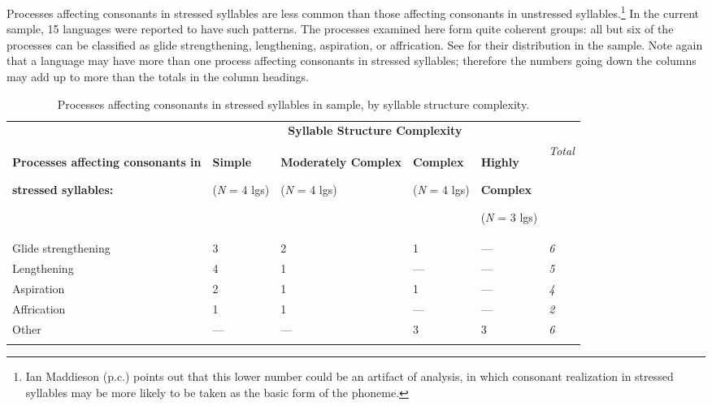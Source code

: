   Processes affecting consonants in stressed syllables are less common than those affecting consonants in unstressed syllables.\footnote{{Ian Maddieson (p.c.) points out that this lower number could be an artifact of analysis, in which consonant realization in stressed syllables may be more likely to be taken as the basic form of the phoneme.}} In the current sample, 15 languages were reported to have such patterns. The processes examined here form quite coherent groups: all but six of the processes can be classified as glide strengthening, lengthening, aspiration, or affrication. See  for their distribution in the sample. Note again that a language may have more than one process affecting consonants in stressed syllables; therefore the numbers going down the columns may add up to more than the totals in the column headings.

\begin{table}
\begin{tabularx}{\textwidth}{XXXXXX}
\lsptoprule
 & \multicolumn{4}{c}{ \textbf{Syllable Structure Complexity}} & \\
{ \textbf{Processes affecting consonants in} }

 \textbf{stressed syllables:} & { \textbf{Simple}}

 (\textit{N} = 4 lgs) & { \textbf{Moderately Complex}}

 (\textit{N} = 4 lgs) & { \textbf{Complex}}

 (\textit{N} = 4 lgs) & { \textbf{Highly} }

{ \textbf{Complex}}

 (\textit{N} = 3 lgs) & \textit{Total}\\
 Glide strengthening & 3 & 2 & 1 & — & \textit{6}\\
 Lengthening & 4 & 1 & — & — & \textit{5}\\
 Aspiration & 2 & 1 & 1 & — & \textit{4}\\
 Affrication & 1 & 1 & — & — & \textit{2}\\
 Other & — & — & 3 & 3 & \textit{6}\\
\lspbottomrule
\end{tabularx}
\caption{\label{tab:5.7}Processes affecting consonants in stressed syllables in sample, by syllable structure complexity.}
\end{table}

